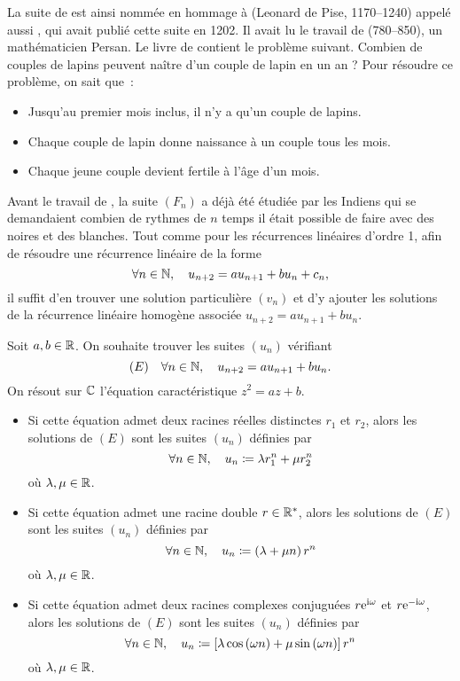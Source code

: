 \documentclass{magnoliaold}
\begin{document}
\begin{remarques}
\remarque La suite de  est ainsi nommée en hommage à  (Leonard de Pise, 1170--1240) appelé aussi , qui avait publié cette suite en 1202. Il avait lu le travail de  (780--850), un mathématicien Persan. Le livre de  contient le problème suivant. Combien de couples de lapins peuvent naître d'un couple de lapin en un an ? Pour résoudre ce problème, on sait que~:
\begin{itemize}
\item Jusqu'au premier mois inclus, il n'y a qu'un couple de lapins.
\item Chaque couple de lapin donne naissance à un couple tous les mois.
\item Chaque jeune couple devient fertile à l'âge d'un mois.
\end{itemize}
Avant le travail de , la suite $(F_n)$ a déjà été étudiée par les Indiens qui se demandaient combien de rythmes de $n$ temps il était possible de faire avec des noires et des blanches.
\remarque Tout comme pour les récurrences linéaires d'ordre 1, afin de
  résoudre une récurrence linéaire de la forme
  \[\forall n\in\mathbb{N},\quad u_{n+2}=a u_{n+1}+b u_n + c_n,\]
  il suffit d'en trouver une solution particulière $(v_n)$ et d'y ajouter les solutions
  de la récurrence linéaire homogène associée $u_{n+2}=a u_{n+1}+b u_n$.
\end{remarques}

\begin{proposition}[utile=-3]
Soit $a,b\in\mathbb{R}$. On souhaite trouver les suites $(u_n)$ vérifiant
\[(E) \quad \forall n\in\mathbb{N} ,\quad u_{n+2}=au_{n+1}+b u_n.\]
On résout sur $\mathbb{C}$ l'équation caractéristique $z^2=az+b$.
\begin{itemize}
\item Si cette équation admet deux racines réelles distinctes $r_1$ et $r_2$,
  alors les solutions de $(E)$ sont les suites $(u_n)$ définies par
  \[\forall n\in\mathbb{N} ,\quad u_n\coloneqq\lambda r_1^n +\mu r_2^n\]
  où $\lambda,\mu\in\mathbb{R}$.
\item Si cette équation admet une racine double $r\in{\mathbb{R}^*}$,
  alors les solutions de $(E)$ sont les suites $(u_n)$ définies par
  \[\forall n\in\mathbb{N} ,\quad u_n\coloneqq\left(\lambda +\mu n\right)r^n\]
  où $\lambda,\mu\in\mathbb{R}$.
\item Si cette équation admet deux racines complexes conjuguées $r{\rm e}^{{\rm i}\omega}$ et
  $r{\rm e}^{-{\rm i}\omega}$, 
  alors les solutions de $(E)$ sont les suites $(u_n)$ définies par
  \[\forall n\in\mathbb{N} ,\quad u_n\coloneqq\left[\lambda \cos\left(\omega n\right)+\mu \sin\left(\omega n\right)\right]
    r^n\]
  où $\lambda,\mu\in\mathbb{R}$.
\end{itemize}
\end{proposition}
\end{document}
